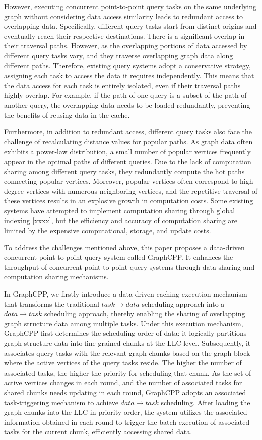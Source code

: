 \documentclass[lettersize,journal]{IEEEtran} %
\begin{document}
However, executing concurrent point-to-point query tasks on the same underlying graph without considering data access similarity leads to redundant access to overlapping data. Specifically, different query tasks start from distinct origins and eventually reach their respective destinations. There is a significant overlap in their traversal paths. However, as the overlapping portions of data accessed by different query tasks vary, and they traverse overlapping graph data along different paths. Therefore, existing query systems adopt a conservative strategy, assigning each task to access the data it requires independently. This means that the data access for each task is entirely isolated, even if their traversal paths highly overlap. For example, if the path of one query is a subset of the path of another query, the overlapping data needs to be loaded redundantly, preventing the benefits of reusing data in the cache.

Furthermore, in addition to redundant access, different query tasks also face the challenge of recalculating distance values for popular paths. As graph data often exhibits a power-law distribution, a small number of popular vertices frequently appear in the optimal paths of different queries. Due to the lack of computation sharing among different query tasks, they redundantly compute the hot paths connecting popular vertices. Moreover, popular vertices often correspond to high-degree vertices with numerous neighboring vertices, and the repetitive traversal of these vertices results in an explosive growth in computation costs. Some existing systems have attempted to implement computation sharing through global indexing [xxxx], but the efficiency and accuracy of computation sharing are limited by the expensive computational, storage, and update costs.

To address the challenges mentioned above, this paper proposes a data-driven concurrent point-to-point query system called GraphCPP. It enhances the throughput of concurrent point-to-point query systems through data sharing and computation sharing mechanisms.

In GraphCPP, we firstly introduce a data-driven caching execution mechanism that transforms the traditional $task→data$ scheduling approach into a $data→task$ scheduling approach, thereby enabling the sharing of overlapping graph structure data among multiple tasks. Under this execution mechanism, GraphCPP first determines the scheduling order of data: it logically partitions graph structure data into fine-grained chunks at the LLC level. Subsequently, it associates query tasks with the relevant graph chunks based on the graph block where the active vertices of the query tasks reside. The higher the number of associated tasks, the higher the priority for scheduling that chunk. As the set of active vertices changes in each round, and the number of associated tasks for shared chunks needs updating in each round, GraphCPP adopts an associated task-triggering mechanism to achieve $data→task$ scheduling. After loading the graph chunks into the LLC in priority order, the system utilizes the associated information obtained in each round to trigger the batch execution of associated tasks for the current chunk, efficiently accessing shared data.
\end{document}
